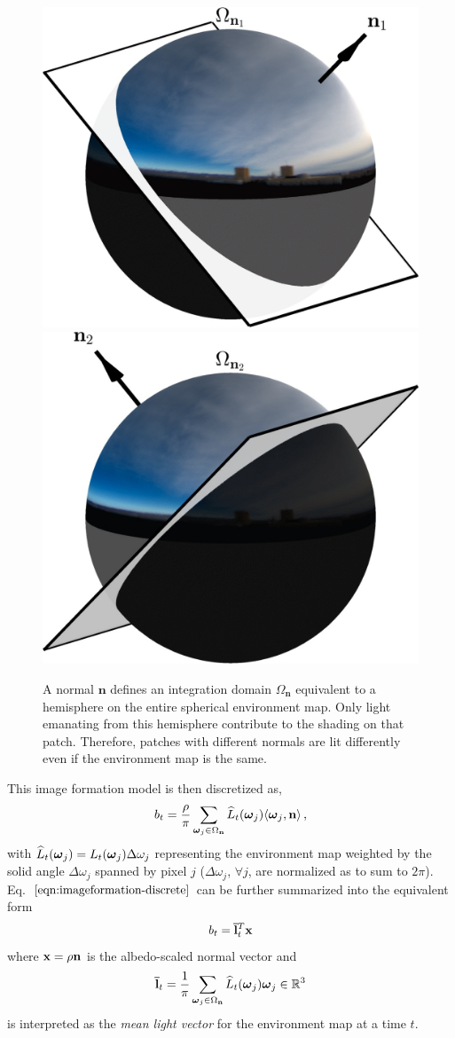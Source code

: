 \begin{figure}
    \centering
    \includegraphics[width=.495\linewidth]{./figures/diagramFig/diagram1.jpg}
    \includegraphics[width=.495\linewidth]{./figures/diagramFig/diagram2.jpg}
    \caption{A normal $\mathbf{n}$ defines an integration domain $\Omega_{\mathbf{n}}$ equivalent to a hemisphere on the entire spherical environment map. Only light emanating from this hemisphere contribute to the shading on that patch. Therefore, patches with different normals are lit differently even if the environment map is the same.}
    \label{fig:normal-diagram}
\end{figure}

This image formation model is then discretized as,
%
\begin{equation}
b_t = \frac{\rho}{\pi}\sum_{\boldsymbol \omega_j \in \Omega_{\bf n}} \widehat{L}_t(\boldsymbol \omega_j) \langle \boldsymbol \omega_j, {\bf n} \rangle\,,
\label{eqn:imageformation-discrete}
\end{equation}
%
with $\widehat{L}_t(\boldsymbol \omega_j) = L_t(\boldsymbol \omega_j)\Delta\omega_j$ representing the environment map weighted by the solid angle $\Delta\omega_j$ spanned by pixel $j$ ($\Delta\omega_j$, $\forall j$, are normalized as to sum to $2\pi$). Eq.~$\eqref{eqn:imageformation-discrete}$ can be further summarized into the equivalent form
%
\begin{equation}
b_t = {\bf \bar l}_t^T \mathbf{x}
\label{eqn:imageformation-simplified}
\end{equation}
where ${\bf x} = \rho {\bf n}$ is the albedo-scaled normal vector and
\begin{equation}
{\bf \bar l}_t = \frac{1}{\pi} \sum_{\boldsymbol \omega_j \in \Omega_{\bf n}} \widehat{L}_t(\boldsymbol \omega_j) \boldsymbol \omega_j \in \mathbb{R}^3
\label{eqn:mean-light}
\end{equation}
is interpreted as the {\em mean light vector} for the environment map at a time $t$.

